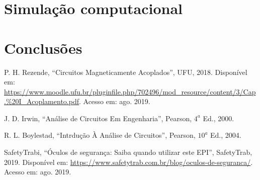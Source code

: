 \documentclass[a4paper,12pt,oneside,openany,table,xcdraw]{article}
\begin{document}
\section{Simulação computacional} %

\section{Conclusões} %


\newpage
\begin{thebibliography}{9} 
    P. H. Rezende,
    “Circuitos Magneticamente Acoplados”, UFU, 2018.
 Disponível em:
 \url{https://www.moodle.ufu.br/pluginfile.php/702496/mod_resource/content/3/Cap.\%20I_Acoplamento.pdf}. Acesso em: ago. 2019.

    J. D. Irwin,
    “Análise de Circuitos Em Engenharia”, Pearson, $4^a$ Ed., 2000.

    R. L. Boylestad,
    “Intrdução À Análise de Circuitos”, Pearson, $10^a$ Ed., 2004.


    SafetyTrabi,
    “Óculos de segurança: Saiba quando utilizar este EPI”, SafetyTrab, 2019.
 Disponível em:
 \url{https://www.safetytrab.com.br/blog/oculos-de-seguranca/}. Acesso em: ago. 2019.




\end{thebibliography}
\end{document}
